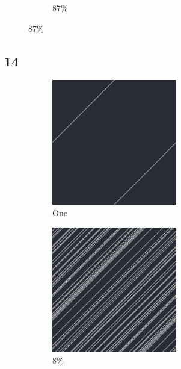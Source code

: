 \documentclass[12pt, fleqn]{report}                             %
\theoremstyle{break}                                            %
\begin{document}
\begin{figure}[ht!]
\begin{subfigure}[b]{0.4\linewidth}
          \caption{87\%}
        \end{subfigure}
      \end{figure}


      \clearpage
      \subsection{14}
      \begin{figure}[ht!]
        \centering
        \begin{subfigure}[b]{0.4\linewidth}
          \includegraphics[width=0.6\textwidth]{Images/14/a.png}
          \caption{One}
        \end{subfigure}
        \begin{subfigure}[b]{0.4\linewidth}
          \includegraphics[width=0.6\textwidth]{Images/14/b.png}
          \caption{8\%}
        \end{subfigure}
        \begin{subfigure}[b]{0.4\linewidth}

\end{subfigure}
\end{figure}
\end{document}
